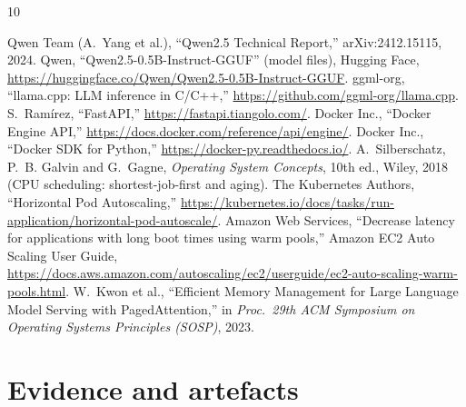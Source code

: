 \documentclass[11pt,a4paper]{article}
\begin{document}
\begin{thebibliography}{10}
\small
{} Qwen Team (A.~Yang et al.), ``Qwen2.5 Technical Report,'' arXiv:2412.15115, 2024.
 Qwen, ``Qwen2.5-0.5B-Instruct-GGUF'' (model files), Hugging Face,
  \url{https://huggingface.co/Qwen/Qwen2.5-0.5B-Instruct-GGUF}.
 ggml-org, ``llama.cpp: LLM inference in C/C++,''
  \url{https://github.com/ggml-org/llama.cpp}.
 S.~Ramírez, ``FastAPI,'' \url{https://fastapi.tiangolo.com/}.
 Docker Inc., ``Docker Engine API,'' \url{https://docs.docker.com/reference/api/engine/}.
 Docker Inc., ``Docker SDK for Python,'' \url{https://docker-py.readthedocs.io/}.
 A.~Silberschatz, P.~B. Galvin and G.~Gagne, \emph{Operating System
  Concepts}, 10th ed., Wiley, 2018 (CPU scheduling: shortest-job-first and aging).
 The Kubernetes Authors, ``Horizontal Pod Autoscaling,''
  \url{https://kubernetes.io/docs/tasks/run-application/horizontal-pod-autoscale/}.
 Amazon Web Services, ``Decrease latency for applications with long boot times
  using warm pools,'' Amazon EC2 Auto Scaling User Guide,
  \url{https://docs.aws.amazon.com/autoscaling/ec2/userguide/ec2-auto-scaling-warm-pools.html}.
 W.~Kwon et al., ``Efficient Memory Management for Large Language Model Serving with
  PagedAttention,'' in \emph{Proc.\ 29th ACM Symposium on Operating Systems Principles (SOSP)}, 2023.
\end{thebibliography}

\clearpage
\appendix
\section{Evidence and artefacts}
\label{app:evidence}
\end{document}
